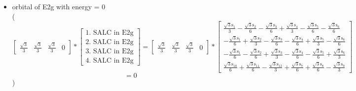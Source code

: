 \documentclass[12pt,a4paper]{article}
\begin{document}
\begin{itemize}
\textcolor{red}{Error in Orthogonalization of SALCs}\item orbital of E2g with energy = 
                                $0$ \\
( 
$$
\left[\begin{matrix}\frac{\sqrt{3}}{3} & \frac{\sqrt{3}}{3} & \frac{\sqrt{3}}{3} & 0\end{matrix}\right] * \left[\begin{array}{c}\text{1. SALC in E2g} \\ \text{2. SALC in E2g} \\ \text{3. SALC in E2g} \\ \text{4. SALC in E2g}\end{array}\right] = \left[\begin{matrix}\frac{\sqrt{3}}{3} & \frac{\sqrt{3}}{3} & \frac{\sqrt{3}}{3} & 0\end{matrix}\right] * \left[\begin{matrix}\frac{\sqrt{3} \text{s}_{1}}{3} - \frac{\sqrt{3} \text{s}_{2}}{6} - \frac{\sqrt{3} \text{s}_{3}}{6} + \frac{\sqrt{3} \text{s}_{4}}{3} - \frac{\sqrt{3} \text{s}_{5}}{6} - \frac{\sqrt{3} \text{s}_{6}}{6}\\- \frac{\sqrt{3} \text{s}_{1}}{6} + \frac{\sqrt{3} \text{s}_{2}}{3} - \frac{\sqrt{3} \text{s}_{3}}{6} - \frac{\sqrt{3} \text{s}_{4}}{6} + \frac{\sqrt{3} \text{s}_{5}}{3} - \frac{\sqrt{3} \text{s}_{6}}{6}\\- \frac{\sqrt{3} \text{s}_{1}}{6} - \frac{\sqrt{3} \text{s}_{2}}{6} + \frac{\sqrt{3} \text{s}_{3}}{3} - \frac{\sqrt{3} \text{s}_{4}}{6} - \frac{\sqrt{3} \text{s}_{5}}{6} + \frac{\sqrt{3} \text{s}_{6}}{3}\\\frac{\sqrt{3} \text{s}_{10}}{6} + \frac{\sqrt{3} \text{s}_{11}}{6} - \frac{\sqrt{3} \text{s}_{12}}{3} + \frac{\sqrt{3} \text{s}_{7}}{6} + \frac{\sqrt{3} \text{s}_{8}}{6} - \frac{\sqrt{3} \text{s}_{9}}{3}\end{matrix}\right] 
 $$ $$ = 0 
 $$ 
 )


\end{itemize}
\end{document}
